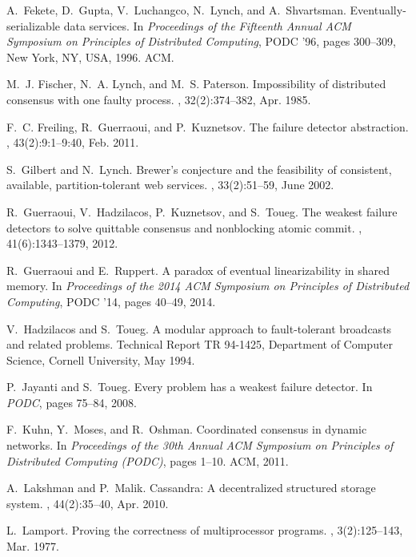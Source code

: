 \documentclass[11pt]{article}
\begin{document}
\begin{thebibliography}{10}
A.~Fekete, D.~Gupta, V.~Luchangco, N.~Lynch, and A.~Shvartsman.
\newblock Eventually-serializable data services.
\newblock In {\em Proceedings of the Fifteenth Annual ACM Symposium on
  Principles of Distributed Computing}, PODC '96, pages 300--309, New York, NY,
  USA, 1996. ACM.

M.~J. Fischer, N.~A. Lynch, and M.~S. Paterson.
\newblock Impossibility of distributed consensus with one faulty process.
, 32(2):374--382, Apr. 1985.

F.~C. Freiling, R.~Guerraoui, and P.~Kuznetsov.
\newblock The failure detector abstraction.
, 43(2):9:1--9:40, Feb. 2011.

S.~Gilbert and N.~Lynch.
\newblock Brewer's conjecture and the feasibility of consistent, available,
  partition-tolerant web services.
, 33(2):51--59, June 2002.

R.~Guerraoui, V.~Hadzilacos, P.~Kuznetsov, and S.~Toueg.
\newblock The weakest failure detectors to solve quittable consensus and
  nonblocking atomic commit.
, 41(6):1343--1379, 2012.

R.~Guerraoui and E.~Ruppert.
\newblock A paradox of eventual linearizability in shared memory.
\newblock In {\em Proceedings of the 2014 ACM Symposium on Principles of
  Distributed Computing}, PODC '14, pages 40--49, 2014.

V.~Hadzilacos and S.~Toueg.
\newblock A modular approach to fault-tolerant broadcasts and related problems.
\newblock Technical Report TR 94-1425, Department of Computer Science, Cornell
  University, May 1994.

P.~Jayanti and S.~Toueg.
\newblock Every problem has a weakest failure detector.
\newblock In {\em PODC}, pages 75--84, 2008.

F.~Kuhn, Y.~Moses, and R.~Oshman.
\newblock Coordinated consensus in dynamic networks.
\newblock In {\em Proceedings of the 30th Annual ACM Symposium on Principles of
  Distributed Computing (PODC)}, pages 1--10. ACM, 2011.

A.~Lakshman and P.~Malik.
\newblock Cassandra: A decentralized structured storage system.
, 44(2):35--40, Apr. 2010.

L.~Lamport.
\newblock Proving the correctness of multiprocessor programs.
, 3(2):125--143, Mar. 1977.


\end{thebibliography}
\end{document}

